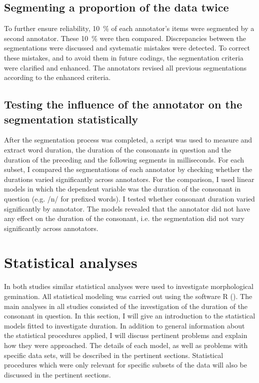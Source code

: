 \subsection{Segmenting a proportion of the data twice}

To further ensure reliability, 10~\% of each annotator's items were segmented by a second annotator. These 10~\% were then compared. Discrepancies between the segmentations were discussed and systematic mistakes were detected. To correct these mistakes, and to avoid them in future codings, the segmentation criteria were clarified and enhanced. The annotators revised all previous segmentations according to the enhanced criteria.


\subsection{Testing the influence of the annotator on the segmentation statistically}

After the segmentation process was completed, a script was used to measure and extract word duration, the duration of the consonants in question and the duration of the preceding and the following segments in milliseconds. For each subset,  I compared the segmentations of each annotator by checking whether the durations varied significantly across annotators.
 For the comparison, I used linear models in which the dependent variable was the duration of the consonant in question (e.g. /n/ for prefixed words). I tested whether consonant duration varied significantly by annotator. The models revealed that the annotator did not have any effect on the duration of the consonant, i.e. the segmentation did not vary significantly across annotators.


\section{Statistical analyses}\label{stats}

In both studies similar statistical analyses were used to investigate {morphological gemination}. All statistical modeling was carried out using the software R (\citealt{RDevelopmentCoreTeam.2014}). 
The main analyses in all studies consisted of the investigation of the duration of the consonant in question. 
In this section, I will give an introduction to the statistical models fitted to investigate duration. In addition to general information about the statistical procedures applied, I will discuss pertinent problems and explain how they were approached. The details of each model, as well as problems with specific data sets, will be described in the pertinent sections. Statistical procedures which were only relevant for specific subsets of the data will also be discussed in the pertinent sections. 




